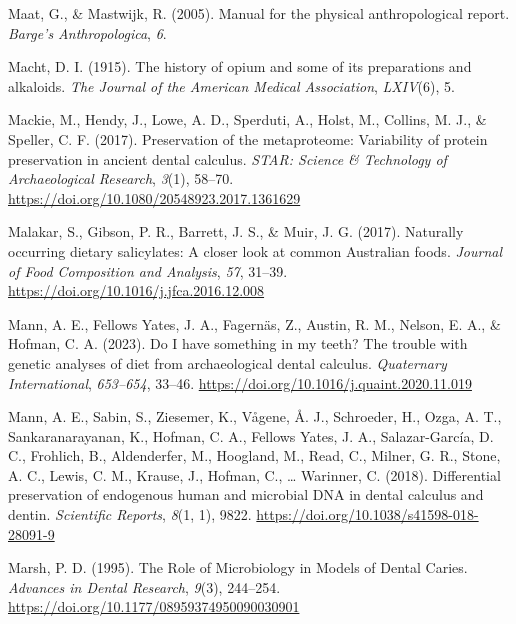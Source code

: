 \documentclass[
  letterpaper,
]{book}
\newlength{\cslhangindent}
\newlength{\cslentryspacingunit} %
\newenvironment{CSLReferences}[2] %
 {%
  \setlength{\parindent}{0pt}
  \ifodd #1
  \let\oldpar\par
  \def\par{\hangindent=\cslhangindent\oldpar}
  \fi
  \setlength{\parskip}{#2\cslentryspacingunit}
 }%
 {}
\begin{document}
\begin{CSLReferences}{1}{0}
\leavevmode{}%
Maat, G., \& Mastwijk, R. (2005). Manual for the physical
anthropological report. \emph{Barge's Anthropologica}, \emph{6}.

\leavevmode{}%
Macht, D. I. (1915). The history of opium and some of its preparations
and alkaloids. \emph{The Journal of the American Medical Association},
\emph{LXIV}(6), 5.

\leavevmode{}%
Mackie, M., Hendy, J., Lowe, A. D., Sperduti, A., Holst, M., Collins, M.
J., \& Speller, C. F. (2017). Preservation of the metaproteome:
Variability of protein preservation in ancient dental calculus.
\emph{STAR: Science \& Technology of Archaeological Research},
\emph{3}(1), 58--70. \url{https://doi.org/10.1080/20548923.2017.1361629}

\leavevmode{}%
Malakar, S., Gibson, P. R., Barrett, J. S., \& Muir, J. G. (2017).
Naturally occurring dietary salicylates: {A} closer look at common
{Australian} foods. \emph{Journal of Food Composition and Analysis},
\emph{57}, 31--39. \url{https://doi.org/10.1016/j.jfca.2016.12.008}

\leavevmode{}%
Mann, A. E., Fellows Yates, J. A., Fagernäs, Z., Austin, R. M., Nelson,
E. A., \& Hofman, C. A. (2023). Do {I} have something in my teeth? {The}
trouble with genetic analyses of diet from archaeological dental
calculus. \emph{Quaternary International}, \emph{653--654}, 33--46.
\url{https://doi.org/10.1016/j.quaint.2020.11.019}

\leavevmode{}%
Mann, A. E., Sabin, S., Ziesemer, K., Vågene, Å. J., Schroeder, H.,
Ozga, A. T., Sankaranarayanan, K., Hofman, C. A., Fellows Yates, J. A.,
Salazar-García, D. C., Frohlich, B., Aldenderfer, M., Hoogland, M.,
Read, C., Milner, G. R., Stone, A. C., Lewis, C. M., Krause, J., Hofman,
C., \ldots{} Warinner, C. (2018). Differential preservation of
endogenous human and microbial {DNA} in dental calculus and dentin.
\emph{Scientific Reports}, \emph{8}(1, 1), 9822.
\url{https://doi.org/10.1038/s41598-018-28091-9}

\leavevmode{}%
Marsh, P. D. (1995). The {Role} of {Microbiology} in {Models} of {Dental
Caries}. \emph{Advances in Dental Research}, \emph{9}(3), 244--254.
\url{https://doi.org/10.1177/08959374950090030901}


\end{CSLReferences}
\end{document}
